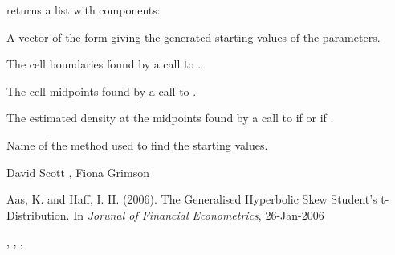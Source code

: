 \documentclass{book}
\begin{document}
\begin{Value}
 returns a list with components:
\begin{ldescription}
\item[\code{paramStart}] A vector of the form 
giving the generated starting values of the parameters.
\item[\code{breaks}] The cell boundaries found by a call to .
\item[\code{midpoints}] The cell midpoints found by a call to .
\item[\code{empDens}] The estimated density at the midpoints found by a call
to  if  or
 if .
\item[\code{svName}] Name of the method used to find the starting values.
\end{ldescription}
\end{Value}
\begin{Author}\relax
David Scott , Fiona Grimson
\end{Author}
\begin{References}\relax
Aas, K. and Haff, I. H. (2006).
The Generalised Hyperbolic Skew Student's t-Distribution.
In \emph{Jorunal of Financial Econometrics}, 26-Jan-2006
\end{References}
\begin{SeeAlso}\relax
{}, , ,
\end{SeeAlso}
\end{document}
